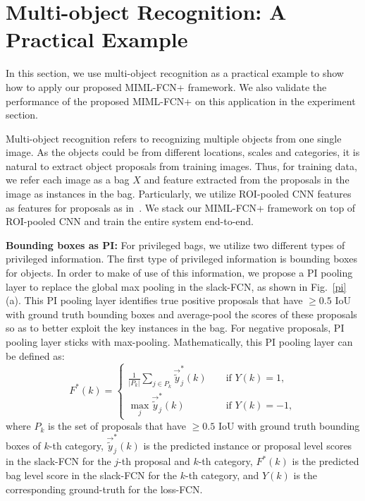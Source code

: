 \documentclass[10pt,twocolumn,letterpaper]{article}
\begin{document}
\section{Multi-object Recognition: A Practical Example}
\label{example} In this section, we use multi-object recognition
as a practical example to show how to apply our proposed MIML-FCN+
framework. We also validate the performance of the proposed
\textsc{MIML-FCN+} on this application in the experiment section.

Multi-object recognition refers to recognizing multiple objects
from one single image. As the objects could be from different
locations, scales and categories, it is natural to extract object
proposals from training images. Thus, for training data, we refer
each image as a bag $X$ and feature extracted from the proposals
in the image as instances in the bag. Particularly, we utilize
ROI-pooled CNN features as features for proposals as
in~\cite{Ren2015}. We stack our MIML-FCN+ framework on top of
ROI-pooled CNN and train the entire system end-to-end.

\textbf{Bounding boxes as PI:} For privileged bags, we utilize two
different types of privileged information. The first type of
privileged information is bounding boxes for objects. In order to
make of use of this information, we propose a PI pooling layer to
replace the global max pooling in the slack-FCN, as shown in
Fig.~\ref{pi}(a). This PI pooling layer identifies true positive
proposals that have $\geq 0.5$ IoU with ground truth bounding
boxes and average-pool the scores of these proposals so as to
better exploit the key instances in the bag. For negative
proposals, PI pooling layer sticks with max-pooling.
Mathematically, this PI pooling layer can be defined as:
\begin{equation}
F^*(k) = \left\{\begin{matrix}

\frac{1}{|P_k|}\sum_{j\in P_k} {\vec{\tilde{y}}^*_{j}(k)} && \text{ if } Y(k) = 1,\\
\max_j\vec{\tilde{y}}^*_{j}(k) && \text{ if } Y(k) = -1,
\end{matrix}\right.
\end{equation}
where $P_k$ is the set of proposals that have $\geq 0.5$ IoU with
ground truth bounding boxes of $k$-th category,
$\vec{\tilde{y}}^*_{j}(k)$ is the predicted instance or proposal
level scores in the slack-FCN for the $j$-th proposal and $k$-th
category, $F^*(k)$ is the predicted bag level score in the
slack-FCN for the $k$-th category, and $Y(k)$ is the corresponding
ground-truth for the loss-FCN.
\end{document}
